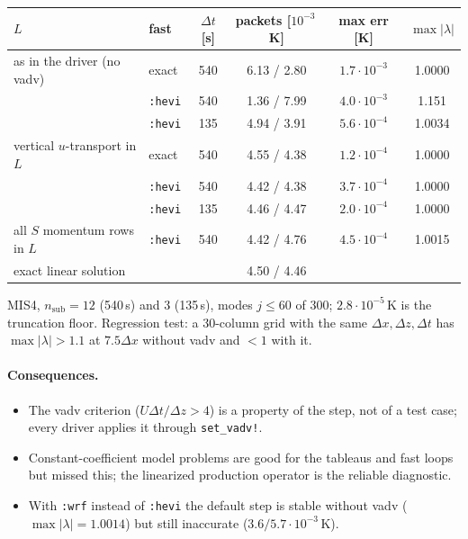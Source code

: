 \documentclass[11pt,a4paper]{article}
\newcommand{\code}[1]{\texttt{#1}}
\newcommand{\dt}{\Delta t}
\begin{document}
\begin{center}
\begin{tabular}{llcccc}
\toprule
$L$ & fast & $\dt$ [s] & packets [$10^{-3}$\,K] & max err [K] & $\max|\lambda|$\\
\midrule
as in the driver (no vadv) & exact & 540 & 6.13 / 2.80 & $1.7\cdot10^{-3}$ & 1.0000\\
 & \code{:hevi} & 540 & 1.36 / 7.99 & $4.0\cdot10^{-3}$ & 1.151\\
 & \code{:hevi} & 135 & 4.94 / 3.91 & $5.6\cdot10^{-4}$ & 1.0034\\
vertical $u$-transport in $L$ & exact & 540 & 4.55 / 4.38 & $1.2\cdot10^{-4}$ & 1.0000\\
 & \code{:hevi} & 540 & 4.42 / 4.38 & $3.7\cdot10^{-4}$ & 1.0000\\
 & \code{:hevi} & 135 & 4.46 / 4.47 & $2.0\cdot10^{-4}$ & 1.0000\\
all $S$ momentum rows in $L$ & \code{:hevi} & 540 & 4.42 / 4.76 & $4.5\cdot10^{-4}$ & 1.0015\\
\midrule
exact linear solution & & & 4.50 / 4.46 & & \\
\bottomrule
\end{tabular}
\end{center}
MIS4, $n_\mathrm{sub} = 12$ (540\,s) and 3 (135\,s), modes $j\le60$ of 300; $2.8\cdot10^{-5}$\,K is the
truncation floor. Regression test: a 30-column grid with the same $\Delta x,\Delta z,\dt$ has
$\max|\lambda|>1.1$ at $7.5\Delta x$ without vadv and $<1$ with it.

\paragraph{Consequences.}
\begin{itemize}
\item The vadv criterion ($U\dt/\Delta z>4$) is a property of the step, not of a test case; every
  driver applies it through \code{set\_vadv!}.
\item Constant-coefficient model problems are good for the tableaus and fast loops but missed this;
  the linearized production operator is the reliable diagnostic.
\item With \code{:wrf} instead of \code{:hevi} the default step is stable without vadv
  ($\max|\lambda| = 1.0014$) but still inaccurate ($3.6/5.7\cdot10^{-3}$\,K).
\end{itemize}

\end{document}
